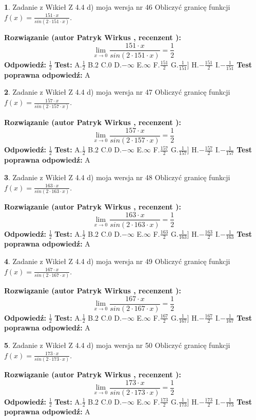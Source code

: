 \documentclass[12pt, a4paper]{article}
\theoremstyle{definition} %
\newtheorem{zad}{}
\newcommand{\zadStart}[1]{\begin{zad}#1\newline}
\newcommand{\zadStop}{\end{zad}}
\newcommand{\rozwStart}[2]{\noindent \textbf{Rozwiązanie (autor #1 , recenzent #2): }\newline}
\newcommand{\rozwStop}{\newline}
\newcommand{\odpStart}{\noindent \textbf{Odpowiedź:}\newline}
\newcommand{\odpStop}{\newline}
\newcommand{\testStart}{\noindent \textbf{Test:}\newline}
\newcommand{\testStop}{\newline}
\newcommand{\kluczStart}{\noindent \textbf{Test poprawna odpowiedź:}\newline}
\newcommand{\kluczStop}{\newline}
\begin{document}
\zadStart{Zadanie z Wikieł Z 4.4 d) moja wersja nr 46}
Obliczyć granicę funkcji $f(x)=\frac{151\cdot x}{sin(2 \cdot151\cdot x)}$.
\zadStop
\rozwStart{Patryk Wirkus}{}
$$\lim\limits_{x\to 0}\frac{151\cdot x}{sin(2 \cdot151\cdot x)}=\frac{1}{2}$$
\rozwStop
\odpStart
$\frac{1}{2}$
\odpStop
\testStart
A.$\frac{1}{2}$
B.$2$
C.$0$
D.$-\infty$
E.$\infty$
F.$\frac{151}{2}$
G.$\frac{1}{151}]$
H.$-\frac{151}{2}$
I.$-\frac{1}{151}$
\testStop
\kluczStart
A
\kluczStop



\zadStart{Zadanie z Wikieł Z 4.4 d) moja wersja nr 47}
Obliczyć granicę funkcji $f(x)=\frac{157\cdot x}{sin(2 \cdot157\cdot x)}$.
\zadStop
\rozwStart{Patryk Wirkus}{}
$$\lim\limits_{x\to 0}\frac{157\cdot x}{sin(2 \cdot157\cdot x)}=\frac{1}{2}$$
\rozwStop
\odpStart
$\frac{1}{2}$
\odpStop
\testStart
A.$\frac{1}{2}$
B.$2$
C.$0$
D.$-\infty$
E.$\infty$
F.$\frac{157}{2}$
G.$\frac{1}{157}]$
H.$-\frac{157}{2}$
I.$-\frac{1}{157}$
\testStop
\kluczStart
A
\kluczStop



\zadStart{Zadanie z Wikieł Z 4.4 d) moja wersja nr 48}
Obliczyć granicę funkcji $f(x)=\frac{163\cdot x}{sin(2 \cdot163\cdot x)}$.
\zadStop
\rozwStart{Patryk Wirkus}{}
$$\lim\limits_{x\to 0}\frac{163\cdot x}{sin(2 \cdot163\cdot x)}=\frac{1}{2}$$
\rozwStop
\odpStart
$\frac{1}{2}$
\odpStop
\testStart
A.$\frac{1}{2}$
B.$2$
C.$0$
D.$-\infty$
E.$\infty$
F.$\frac{163}{2}$
G.$\frac{1}{163}]$
H.$-\frac{163}{2}$
I.$-\frac{1}{163}$
\testStop
\kluczStart
A
\kluczStop



\zadStart{Zadanie z Wikieł Z 4.4 d) moja wersja nr 49}
Obliczyć granicę funkcji $f(x)=\frac{167\cdot x}{sin(2 \cdot167\cdot x)}$.
\zadStop
\rozwStart{Patryk Wirkus}{}
$$\lim\limits_{x\to 0}\frac{167\cdot x}{sin(2 \cdot167\cdot x)}=\frac{1}{2}$$
\rozwStop
\odpStart
$\frac{1}{2}$
\odpStop
\testStart
A.$\frac{1}{2}$
B.$2$
C.$0$
D.$-\infty$
E.$\infty$
F.$\frac{167}{2}$
G.$\frac{1}{167}]$
H.$-\frac{167}{2}$
I.$-\frac{1}{167}$
\testStop
\kluczStart
A
\kluczStop



\zadStart{Zadanie z Wikieł Z 4.4 d) moja wersja nr 50}
Obliczyć granicę funkcji $f(x)=\frac{173\cdot x}{sin(2 \cdot173\cdot x)}$.
\zadStop
\rozwStart{Patryk Wirkus}{}
$$\lim\limits_{x\to 0}\frac{173\cdot x}{sin(2 \cdot173\cdot x)}=\frac{1}{2}$$
\rozwStop
\odpStart
$\frac{1}{2}$
\odpStop
\testStart
A.$\frac{1}{2}$
B.$2$
C.$0$
D.$-\infty$
E.$\infty$
F.$\frac{173}{2}$
G.$\frac{1}{173}]$
H.$-\frac{173}{2}$
I.$-\frac{1}{173}$
\testStop
\kluczStart
A
\kluczStop
\end{document}
